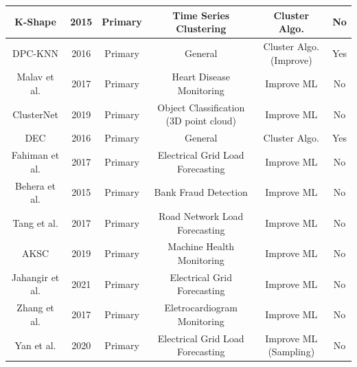 \begin{table}[!ht]
\begin{adjustwidth}{-0.8cm}{}
{\begin{minipage}{\textwidth}
\begin{tabular}{@{}cccccc@{}}
    K-Shape \cite{Paparrizos.Gravano_kShapeEfficientAccurate_2015a}          & 2015          & Primary       & Time Series Clustering                 & Cluster Algo.                   & No          \\ \midrule
    DPC-KNN \cite{Du.Ding.ea_Studydensitypeaks_2016}         & 2016          & Primary       & General                                & Cluster Algo. (Improve)         & Yes         \\ \midrule
    Malav et al. \cite{Malav.Kadam.ea_PREDICTIONHEARTDISEASE_2017}     & 2017          & Primary       & Heart Disease Monitoring               & Improve ML                      & No          \\ \midrule
    ClusterNet \cite{Chen.Li.ea_ClusterNetDeepHierarchical_2019}      & 2019          & Primary       & Object Classification (3D point cloud) & Improve ML                      & No          \\ \midrule
    DEC \cite{Xie.Girshick.ea_UnsupervisedDeepEmbedding_2016}             & 2016          & Primary       & General                                & Cluster Algo.                   & Yes         \\ \midrule
    Fahiman et al. \cite{Fahiman.Erfani.ea_Improvingloadforecasting_2017}   & 2017          & Primary       & Electrical Grid Load Forecasting       & Improve ML                      & No          \\ \midrule
    Behera et al. \cite{Behera.Panigrahi_CreditCardFraud_2015}    & 2015          & Primary       & Bank Fraud Detection                   & Improve ML                      & No          \\ \midrule
    Tang et al. \cite{Tang.Liu.ea_ImprovedFuzzyNeural_2017}     & 2017          & Primary       & Road Network Load Forecasting          & Improve ML                      & No          \\ \midrule
    AKSC \cite{Cheng.Zhu.ea_MachineHealthMonitoring_2019}            & 2019          & Primary       & Machine Health Monitoring              & Improve ML                      & No          \\ \midrule
    Jahangir et al. \cite{Jahangir.Tayarani.ea_DeepLearningBasedForecasting_2021} & 2021          & Primary       & Electrical Grid Forecasting            & Improve ML                      & No          \\ \midrule
    Zhang et al. \cite{Zhang.Wang.ea_PatientspecificECGclassification_2017}    & 2017          & Primary       & Eletrocardiogram Monitoring            & Improve ML                      & No          \\ \midrule
    Yan et al. \cite{Yang.Li.ea_BayesianDeepLearningBased_2020}      & 2020          & Primary       & Electrical Grid Load Forecasting       & Improve ML (Sampling)           & No          \\ \bottomrule
    \end{tabular}
\end{minipage}}
\end{adjustwidth}
    \end{table}

